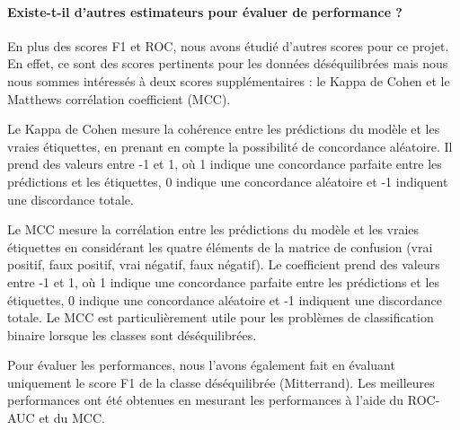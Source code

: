 \documentclass{article}
\begin{document}
\paragraph{Existe-t-il d'autres estimateurs pour évaluer de performance ?}

En plus des scores F1 et ROC, nous avons étudié d'autres scores pour ce projet. En effet, ce sont des scores pertinents pour les données déséquilibrées mais nous nous sommes intéressés à deux scores supplémentaires : le Kappa de Cohen et le Matthews corrélation coefficient (MCC).

Le Kappa de Cohen mesure la cohérence entre les prédictions du modèle et les vraies étiquettes, en prenant en compte la possibilité de concordance aléatoire. Il prend des valeurs entre -1 et 1, où 1 indique une concordance parfaite entre les prédictions et les étiquettes, 0 indique une concordance aléatoire et -1 indiquent une discordance totale.

Le MCC mesure la corrélation entre les prédictions du modèle et les vraies étiquettes en considérant les quatre éléments de la matrice de confusion (vrai positif, faux positif, vrai négatif, faux négatif). Le coefficient prend des valeurs entre -1 et 1, où 1 indique une concordance parfaite entre les prédictions et les étiquettes, 0 indique une concordance aléatoire et -1 indiquent une discordance totale. Le MCC est particulièrement utile pour les problèmes de classification binaire lorsque les classes sont déséquilibrées.

Pour évaluer les performances, nous l'avons également fait en évaluant uniquement le score F1 de la classe déséquilibrée (Mitterrand). Les meilleures performances ont été obtenues en mesurant les performances à l'aide du ROC-AUC et du MCC.
\end{document}
